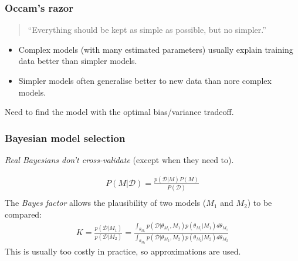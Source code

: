 
\begin{frame}
\frametitle{Occam's razor}
\begin{quote}
``Everything should be kept as simple as possible, but no simpler.''
\par {}
\end{quote}
\vspace{0.25cm}
\begin{itemize}
\item Complex models (with many estimated parameters) usually explain training data better than simpler models.\par
\item Simpler models often generalise better to new data than nore complex models.\par
\end{itemize}
Need to find the model with the optimal bias/variance tradeoff.\par
\end{frame}

\begin{frame}
\frametitle{Bayesian model selection}
\emph{Real Bayesians don't cross-validate} (except when they need to).\par
\begin{align*}
P(M|\mathcal{D}) = \frac{p(\mathcal{D}|M) P(M)}{P(\mathcal{D})}\\
\end{align*}
The \emph{Bayes factor} allows the plausibility of two models ($M_1$ and $M_2$) to be compared:
\begin{align*}
K = \frac{p(\mathcal{D}|M_1)}{p(\mathcal{D}|M_2)} =
    \frac{\int_{\theta_{M_1}} p(\mathcal{D}|\theta_{M_1},M_1) p(\theta_{M_1}|M_1) d{\theta}_{M_1}}
         {\int_{\theta_{M_2}} p(\mathcal{D}|\theta_{M_2},M_2) p(\theta_{M_2}|M_2) d{\theta}_{M_2}}
\end{align*}
This is usually too costly in practice, so approximations are used.
\end{frame}

